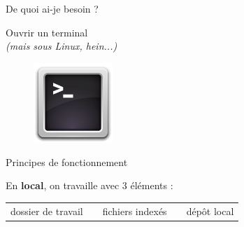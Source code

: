 \documentclass{beamer}
\begin{document}
\begin{frame}{De quoi ai-je besoin ?}
	\begin{center}
 		\Large{Ouvrir un terminal}\\
 		{\small  \textit{(mais sous Linux, hein...)}}
	\end{center}

	\begin{figure}
		\centering
		\includegraphics[height=3cm]{img/terminal}
	\end{figure}
\end{frame}

\begin{frame}{Principes de fonctionnement}

	En \textbf{local}, on travaille avec 3 éléments :
	\begin{figure}
  		\centering
	\end{figure}
	
	\begin{center}
		\begin{tabular}{p{2cm} p{0.7cm} p{2cm} p{0.7cm} p{2cm}}
		\centering dossier de travail & & \centering fichiers indexés & & \centering dépôt local
		\end{tabular}
	\end{center}
\end{frame}
\end{document}
